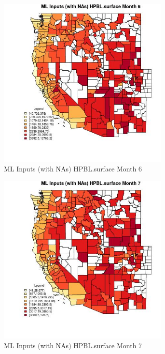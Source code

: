 \begin{figure} 
\centering  
\includegraphics[width=0.77\textwidth]{Code_Outputs/Report_ML_input_PM25_Step4_part_f_de_duplicated_aveswNAs_CountyHPBLsurfacemedianMonth6.jpg} 
\caption{\label{fig:Report_ML_input_PM25_Step4_part_f_de_duplicated_aveswNAsCountyHPBLsurfacemedianMonth6}ML Inputs (with NAs) HPBL.surface Month 6} 
\end{figure} 
 

\clearpage 

\begin{figure} 
\centering  
\includegraphics[width=0.77\textwidth]{Code_Outputs/Report_ML_input_PM25_Step4_part_f_de_duplicated_aveswNAs_CountyHPBLsurfacemedianMonth7.jpg} 
\caption{\label{fig:Report_ML_input_PM25_Step4_part_f_de_duplicated_aveswNAsCountyHPBLsurfacemedianMonth7}ML Inputs (with NAs) HPBL.surface Month 7} 
\end{figure} 
 

